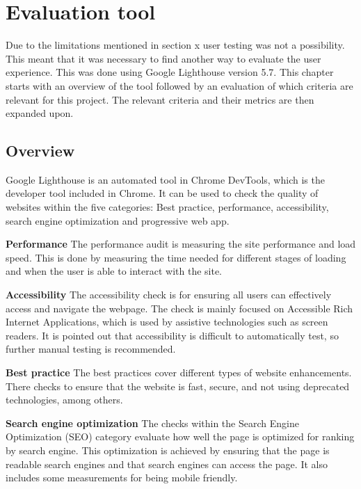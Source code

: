 \chapter{Evaluation tool}

Due to the limitations mentioned in section x user testing was not a possibility. This meant that it was necessary to find another way to evaluate the user experience. This was done using Google Lighthouse version 5.7. 
This chapter starts with an overview of the tool followed by an evaluation of which criteria are relevant for this project. The relevant criteria and their metrics are then expanded upon.

\section{Overview}
Google Lighthouse is an automated tool in Chrome DevTools, which is the developer tool included in Chrome. It can be used to check the quality of websites within the five categories: Best practice, performance, accessibility, search engine optimization and progressive web app. \citep{Lighthouse}

\textbf{Performance}
The performance audit is measuring the site performance and load speed. This is done by measuring the time needed for different stages of loading and when the user is able to interact with the site. \citep{LhPerformance}


\textbf{Accessibility}
The accessibility check is for ensuring all users can effectively access and navigate the webpage. 
The check is mainly focused on Accessible Rich Internet Applications, which is used by assistive technologies such as screen readers.\citep{ARIA} It is pointed out that accessibility is difficult to automatically test, so further manual testing is recommended. 

\citep{LhAccess}

\textbf{Best practice}
The best practices cover different types of website enhancements. There checks to ensure that the website is fast, secure, and not using deprecated technologies, among others. \citep{LhBP}

\textbf{Search engine optimization}
The checks within the Search Engine Optimization (SEO) category evaluate how well the page is optimized for ranking by search engine. This optimization is achieved by ensuring that the page is readable search engines and that search engines can access the page. It also includes some measurements for being mobile friendly.
\citep{LhSEO}

